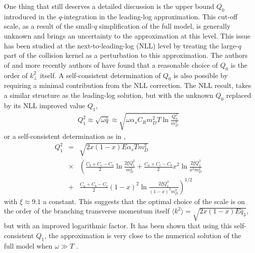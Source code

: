 One thing that still deserves a detailed discussion is the upper bound $Q_0$ introduced in the $q$-integration in the leading-log approximation.
This cut-off scale, as a result of the small-$q$ simplification of the full model, is generally unknown and brings an uncertainty to the approximation at this level.
This issue has been studied at the next-to-leading-log (NLL) level by treating the large-$q$ part of the collision kernel as a perturbation to this approximation.
The authors of \cite{Arnold:2008zu} and more recently authors of \cite{Mehtar-Tani:2019tvy} have found that a reasonable choice of $Q_0$ is the order of $k_\perp^2$ itself.
A self-consistent determination of $Q_0$ is also possible by requiring a minimal contribution from the NLL correction.
The NLL result, takes a similar structure as the leading-log solution, but with the unknown $Q_0$ replaced by its NLL improved value $Q_{1}$,
\begin{eqnarray}
Q_1^2  \approx \sqrt{\omega \hat{q}} \approx \sqrt{\omega \alpha_s C_R m_D^2 T \ln\frac{Q_0^2}{m_D^2}}
\label{eq:Q1}
\end{eqnarray}
or a self-consistent determination as in \cite{Arnold:2008zu},
\begin{eqnarray}
Q_1^2 &=& \sqrt{2 x (1-x) E \alpha_s T m_D^2}\\\nonumber
&\times & \left(
\frac{C_b+C_c-C_a}{2}\ln\frac{2\xi Q_1^2}{m_D^2} + \frac{C_a+C_c-C_b}{2} x^2 \ln\frac{2\xi Q_1^2}{x^2 m_D^2} \right.\\\nonumber 
&+& \left.\frac{C_a+C_b-C_c}{2} (1-x)^2 \ln\frac{2\xi Q_1^2}{(1-x)^2 m_D^2} \right)^{1/2}
\label{eq:Q1-sf}
\end{eqnarray}
with $\xi \approx 9.1$ a constant. 
This suggests that the optimal choice of the scale is on the order of the branching transverse momentum itself $\langle k^2 \rangle = \sqrt{2x(1-x)E\hat{q}_3}$, but with an improved logarithmic factor.
It has been shown that using this self-consistent $Q_1$, the approximation is very close to the numerical solution of the full model when $\omega \gg T$ \cite{Arnold:2008zu}.

